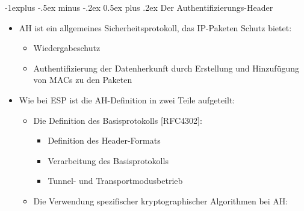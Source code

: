 \documentclass[a4paper]{article}
\makeatletter
\renewcommand{\subsection}{\@startsection{subsection}{2}{0mm}%
 {-1explus -.5ex minus -.2ex}%
 {0.5ex plus .2ex}%
 {\normalfont\normalsize\bfseries}}
\makeatother
\begin{document}
\begin{multicols}{3}
    \subsection{Der
        Authentifizierungs-Header}

    \begin{itemize}
        \item
              AH ist ein allgemeines Sicherheitsprotokoll, das IP-Paketen Schutz
              bietet:

              \begin{itemize}
                  \item
                        Wiedergabeschutz
                  \item
                        Authentifizierung der Datenherkunft durch Erstellung und Hinzufügung
                        von MACs zu den Paketen
              \end{itemize}
        \item
              Wie bei ESP ist die AH-Definition in zwei Teile aufgeteilt:

              \begin{itemize}
                  \item
                        Die Definition des Basisprotokolls {[}RFC4302{]}:

                        \begin{itemize}
                            \item
                                  Definition des Header-Formats
                            \item
                                  Verarbeitung des Basisprotokolls
                            \item
                                  Tunnel- und Transportmodusbetrieb
                        \end{itemize}
                  \item
                        Die Verwendung spezifischer kryptographischer Algorithmen bei AH:


\end{itemize}
\end{itemize}
\end{multicols}
\end{document}
